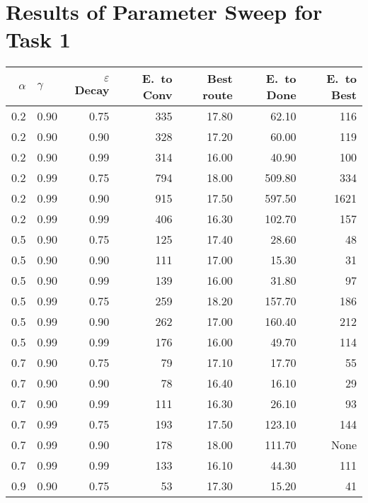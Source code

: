 \renewcommand{\topfraction}{1}
\renewcommand{\bottomfraction}{1}
\renewcommand{\textfraction}{0}
\renewcommand{\floatpagefraction}{1}

\renewcommand{\thesection}{Appendix A}
\section{Results of Parameter Sweep for Task 1}
\label{param_sweep_result_appendix}

\begin{table}[h]
	\scriptsize
	\centering
	\begin{tabular}{r l r | r r r r}
		\toprule
		$\alpha$ & $\gamma$ & $\varepsilon$ Decay &
		E.\ to Conv & Best route & E.\ to Done & E.\ to Best\footnotemark[0]{} \\
		\midrule
		0.2  & 0.90  & 0.75 & 335 & 17.80 & 62.10  & 116 \\
		0.2  & 0.90  & 0.90 & 328 & 17.20 & 60.00  & 119 \\
		0.2  & 0.90  & 0.99 & 314 & 16.00 & 40.90  & 100 \\
		0.2  & 0.99  & 0.75 & 794 & 18.00 & 509.80 & 334 \\
		0.2  & 0.99  & 0.90 & 915 & 17.50 & 597.50 & 1621 \\
		0.2  & 0.99  & 0.99 & 406 & 16.30 & 102.70 & 157 \\
		0.5  & 0.90  & 0.75 & 125 & 17.40 & 28.60  & 48 \\
		0.5  & 0.90  & 0.90 & 111 & 17.00 & 15.30  & 31 \\
		\rowcolor{YellowGreen}
		0.5  & 0.90  & 0.99 & 139 & 16.00 & 31.80  & 97 \\
		0.5  & 0.99  & 0.75 & 259 & 18.20 & 157.70 & 186 \\
		0.5  & 0.99  & 0.90 & 262 & 17.00 & 160.40 & 212 \\
		0.5  & 0.99  & 0.99 & 176 & 16.00 & 49.70  & 114 \\
		0.7  & 0.90  & 0.75 & 79  & 17.10 & 17.70  & 55 \\
		0.7  & 0.90  & 0.90 & 78  & 16.40 & 16.10  & 29 \\
		0.7  & 0.90  & 0.99 & 111 & 16.30 & 26.10  & 93 \\
		0.7  & 0.99  & 0.75 & 193 & 17.50 & 123.10 & 144 \\
		0.7  & 0.99  & 0.90 & 178 & 18.00 & 111.70 & None \\
		0.7  & 0.99  & 0.99 & 133 & 16.10 & 44.30  & 111 \\
		0.9 & 0.90  & 0.75 & 53  & 17.30 & 15.20  & 41 \\

\end{tabular}
\end{table}
